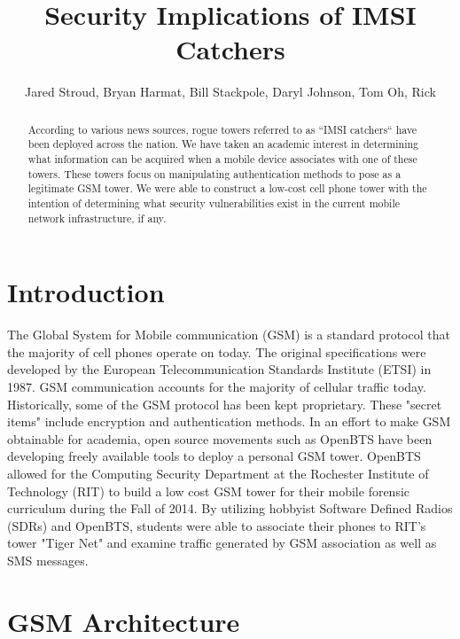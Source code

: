 \documentclass[10pt,a4paper,titlepage]{report}
\title{Security Implications of IMSI Catchers}
\author{Jared Stroud, Bryan Harmat, Bill Stackpole, Daryl Johnson, Tom Oh, Rick}
\begin{document}
\begin{titlepage}
\maketitle
\end{titlepage}

\begin{abstract}
According to various news sources, rogue towers referred to as “IMSI catchers“ have been deployed across the nation. We have taken an academic interest in determining what information can be acquired when a mobile device associates with one of these towers. These towers focus on manipulating authentication methods to pose as a legitimate GSM tower. We were able to construct a low-cost cell phone tower with the intention of determining what security vulnerabilities exist in the current mobile network infrastructure, if any.
\end{abstract}


\chapter*{Introduction}

The Global System for Mobile communication (GSM) is a standard protocol that the majority of cell phones operate on today. The original specifications were developed by the European Telecommunication Standards Institute (ETSI) in 1987. GSM communication accounts for the majority of cellular traffic today. Historically, some of the GSM protocol has been kept proprietary. These "secret items" include encryption and authentication methods. In an effort to make GSM obtainable for academia, open source movements such as OpenBTS have been developing freely available tools to deploy a personal GSM tower. OpenBTS allowed for  the Computing Security Department at the Rochester Institute of Technology (RIT) to build a low cost GSM tower for their mobile forensic curriculum during the Fall of 2014. By utilizing hobbyist Software Defined Radios (SDRs) and OpenBTS, students were able to associate their phones to RIT's tower "Tiger Net" and examine traffic generated by GSM association as well as SMS messages. 


\chapter*{GSM Architecture}
\end{document}
